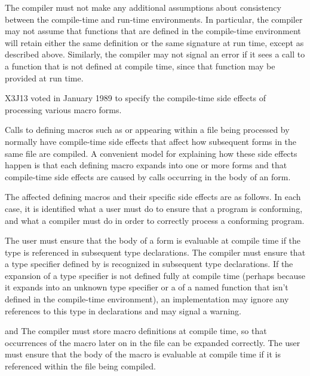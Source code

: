 \begin{newer}
The compiler must not make any additional assumptions about
consistency between the compile-time and run-time environments.  In 
particular, the compiler may not assume that functions that are defined
	in the compile-time environment will retain either the
	same definition or the same signature at run time, except
as described above.
Similarly,
the compiler may not signal an error if it sees a call to a
	function that is not defined at compile time, since that function
	may be provided at run time.

X3J13 voted in January 1989 
to specify the compile-time side effects of processing various macro forms.

Calls to defining macros such as  or  appearing
    within a file being processed by  normally have
    compile-time side effects that affect how subsequent forms in the
    same file are compiled.  A convenient model for explaining how these
    side effects happen is that each defining macro expands into one or
    more  forms and that compile-time
    side effects are caused by calls occurring in the body of an
     form.

The affected defining macros and their specific side effects are
    as follows.  In each case, it is identified what a user must do to
    ensure that a program is conforming, and what a compiler must do
    in order to correctly process a conforming program.

\begin{flushdesc}
\item[\cd{deftype}]
The user must ensure that the body of a  form is
    evaluable at compile time if the type is referenced in subsequent type
    declarations.  The compiler must ensure that a type
    specifier defined by 
    is recognized in subsequent type declarations.  If the
    expansion of a type specifier is not defined fully at compile time
    (perhaps because it expands into an unknown type specifier or a
     of a named function that isn't defined in the compile-time
    environment), an implementation may ignore any references to this type
    in declarations and may signal a warning.

\item[\cd{defmacro} and \cd{define-modify-macro}]   
The compiler must store macro
    definitions at compile time, so that occurrences of the macro later on
    in the file can be expanded correctly.  The user must ensure that the
    body of the macro is evaluable at compile time if it is referenced
    within the file being compiled.


\end{flushdesc}
\end{newer}
